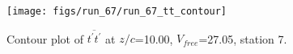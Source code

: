 \begin{figure}[H]
\centering
\texttt{[image: figs/run\_67/run\_67\_tt\_contour]}
\caption{Contour plot of $\overline{t^\prime t^\prime}$ at $z/c$=10.00, $V_{free}$=27.05, station 7.}
\label{fig:run_67_tt_contour}
\end{figure}



